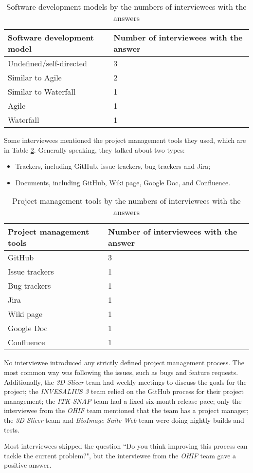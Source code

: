 \begin{table}[H]
\centering
\begin{tabular}{ll}
\hline
Software development model & Number of interviewees with the answer \\ \hline
Undefined/self-directed & 3 \\
Similar to Agile & 2 \\
Similar to Waterfall & 1 \\
Agile & 1 \\
Waterfall & 1 \\ \hline
\end{tabular}
\caption{\label{tab_developmen_models}Software development models by the numbers of interviewees with the answers}
\end{table}

Some interviewees mentioned the project management tools they used, which are in Table \ref{tab_pm_tools}. Generally speaking, they talked about two types:

\begin{itemize}
\item Trackers, including GitHub, issue trackers, bug trackers and Jira;
\item Documents, including GitHub, Wiki page, Google Doc, and Confluence.
\end{itemize}

\begin{table}[H]
\centering
\begin{tabular}{ll}
\hline
Project management tools & Number of interviewees with the answer \\ \hline
GitHub & 3 \\
Issue trackers & 1 \\
Bug trackers & 1 \\
Jira & 1 \\
Wiki page & 1 \\
Google Doc & 1 \\
Confluence & 1 \\ \hline
\end{tabular}
\caption{\label{tab_pm_tools}Project management tools by the numbers of interviewees with the answers}
\end{table}

No interviewee introduced any strictly defined project management process. The most common way was following the issues, such as bugs and feature requests. Additionally, the \textit{3D Slicer} team had weekly meetings to discuss the goals for the project; the \textit{INVESALIUS 3} team relied on the GitHub process for their project management; the \textit{ITK-SNAP} team had a fixed six-month release pace; only the interviewee from the \textit{OHIF} team mentioned that the team has a project manager; the \textit{3D Slicer} team and \textit{BioImage Suite Web} team were doing nightly builds and tests.

Most interviewees skipped the question ``Do you think improving this process can tackle the current problem?", but the interviewee from the \textit{OHIF} team gave a positive answer.
